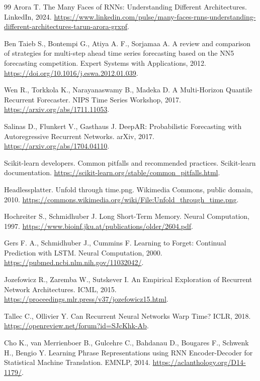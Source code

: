 \documentclass[12pt,fleqn]{article}
\begin{document}
\newpage
\begin{thebibliography}{99}
Arora T.
The Many Faces of RNNs: Understanding Different Architectures.
LinkedIn, 2024.
\url{https://www.linkedin.com/pulse/many-faces-rnns-understanding-different-architectures-tarun-arora-grxpf}.

Ben Taieb S., Bontempi G., Atiya A. F., Sorjamaa A.
A review and comparison of strategies for multi-step ahead time series forecasting based on the NN5 forecasting competition.
Expert Systems with Applications, 2012.
\url{https://doi.org/10.1016/j.eswa.2012.01.039}.

Wen R., Torkkola K., Narayanaswamy B., Madeka D.
A Multi-Horizon Quantile Recurrent Forecaster.
NIPS Time Series Workshop, 2017.
\url{https://arxiv.org/abs/1711.11053}.

Salinas D., Flunkert V., Gasthaus J.
DeepAR: Probabilistic Forecasting with Autoregressive Recurrent Networks.
arXiv, 2017.
\url{https://arxiv.org/abs/1704.04110}.

Scikit-learn developers.
Common pitfalls and recommended practices.
Scikit-learn documentation.
\url{https://scikit-learn.org/stable/common_pitfalls.html}.

Headlessplatter.
Unfold through time.png.
Wikimedia Commons, public domain, 2010.
\url{https://commons.wikimedia.org/wiki/File:Unfold_through_time.png}.

Hochreiter S., Schmidhuber J.
Long Short-Term Memory.
Neural Computation, 1997.
\url{https://www.bioinf.jku.at/publications/older/2604.pdf}.

Gers F. A., Schmidhuber J., Cummins F.
Learning to Forget: Continual Prediction with LSTM.
Neural Computation, 2000.
\url{https://pubmed.ncbi.nlm.nih.gov/11032042/}.

Jozefowicz R., Zaremba W., Sutskever I.
An Empirical Exploration of Recurrent Network Architectures.
ICML, 2015.
\url{https://proceedings.mlr.press/v37/jozefowicz15.html}.

Tallec C., Ollivier Y.
Can Recurrent Neural Networks Warp Time?
ICLR, 2018.
\url{https://openreview.net/forum?id=SJcKhk-Ab}.

Cho K., van Merrienboer B., Gulcehre C., Bahdanau D., Bougares F., Schwenk H., Bengio Y.
Learning Phrase Representations using RNN Encoder-Decoder for Statistical Machine Translation.
EMNLP, 2014.
\url{https://aclanthology.org/D14-1179/}.


\end{thebibliography}
\end{document}
